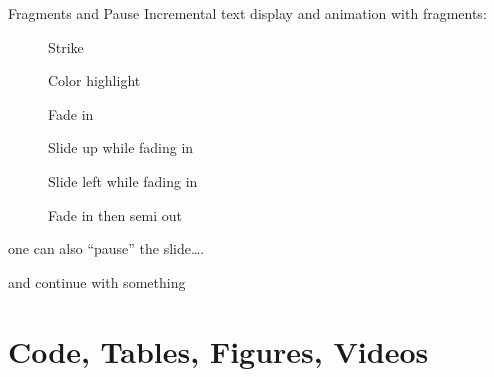 \documentclass[
  ignorenonframetext,
  aspectratio=169,
]{beamer}
\theoremstyle{plain}
\theoremstyle{remark}
\begin{document}
\begin{frame}{Fragments and Pause}
\label{fragments-and-pause}
Incremental text display and animation with fragments:

\begin{figure}

\begin{minipage}{0.50\linewidth}
Strike\end{minipage}%
%
\begin{minipage}{0.50\linewidth}
Color highlight\end{minipage}%
\newline
\begin{minipage}{0.50\linewidth}
Fade in\end{minipage}%
%
\begin{minipage}{0.50\linewidth}
Slide up while fading in\end{minipage}%
\newline
\begin{minipage}{0.50\linewidth}
Slide left while fading in\end{minipage}%
%
\begin{minipage}{0.50\linewidth}
Fade in then semi out\end{minipage}%

\end{figure}%

\pause

one can also ``pause'' the slide\ldots.

\pause

and continue with something
\end{frame}

\section{Code, Tables, Figures,
Videos}\label{code-tables-figures-videos}
\end{document}
